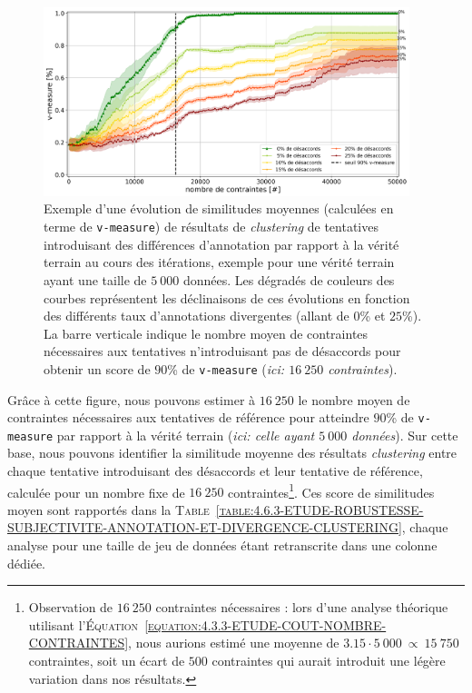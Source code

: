 			\begin{figure}[!htb]
				\centering
				\includegraphics[width=0.95\textwidth]{figures/etude-robustesse-subjectivite-et-difference-5000}
				\caption{
					Exemple d'une évolution de similitudes moyennes (calculées en terme de \texttt{v-measure}) de résultats de \textit{clustering} de tentatives introduisant des différences d'annotation par rapport à la vérité terrain au cours des itérations, exemple pour une vérité terrain ayant une taille de $5~000$ données.
					Les dégradés de couleurs des courbes représentent les déclinaisons de ces évolutions en fonction des différents taux d'annotations divergentes (allant de $0$\% et $25$\%).
					La barre verticale indique le nombre moyen de contraintes nécessaires aux tentatives n'introduisant pas de désaccords pour obtenir un score de $90$\% de \texttt{v-measure} (\textit{ici: $16~250$ contraintes}).
				}
				\label{figure:4.6.3-ETUDE-ROBUSTESSE-SUBJECTIVITE-ANNOTATION-ET-DIVERGENCE-5000}
			\end{figure}
			
			Grâce à cette figure, nous pouvons estimer à $16~250$ le nombre moyen de contraintes nécessaires aux tentatives de référence pour atteindre $90$\% de \texttt{v-measure} par rapport à la vérité terrain (\textit{ici: celle ayant $5~000$ données}).
			Sur cette base, nous pouvons identifier la similitude moyenne des résultats \textit{clustering} entre chaque tentative introduisant des désaccords et leur tentative de référence, calculée pour un nombre fixe de $16~250$ contraintes\footnote{
				Observation de $16~250$ contraintes nécessaires : lors d'une analyse théorique utilisant l'\textsc{Équation~\ref{equation:4.3.3-ETUDE-COUT-NOMBRE-CONTRAINTES}}, nous aurions estimé une moyenne de $3.15 \cdot 5~000~\propto~15~750$ contraintes, soit un écart de $500$ contraintes qui aurait introduit une légère variation dans nos résultats.
			}.
			Ces score de similitudes moyen sont rapportés dans la \textsc{Table~\ref{table:4.6.3-ETUDE-ROBUSTESSE-SUBJECTIVITE-ANNOTATION-ET-DIVERGENCE-CLUSTERING}}, chaque analyse pour une taille de jeu de données étant retranscrite dans une colonne dédiée.
			
